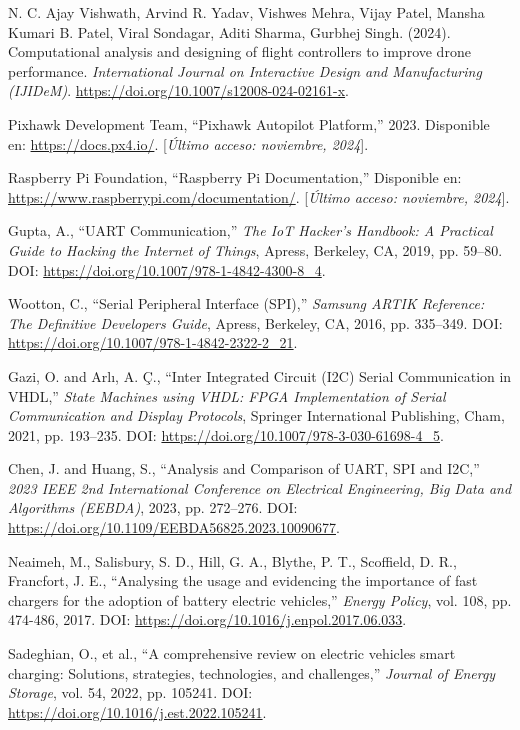 \begin{thebibliography}{30}
    N. C. Ajay Vishwath, Arvind R. Yadav, Vishwes Mehra, Vijay Patel, Mansha Kumari B. Patel, Viral Sondagar, Aditi Sharma, Gurbhej Singh. (2024). Computational analysis and designing of flight controllers to improve drone performance. \textit{International Journal on Interactive Design and Manufacturing (IJIDeM)}. \url{https://doi.org/10.1007/s12008-024-02161-x}.

    Pixhawk Development Team, ``Pixhawk Autopilot Platform,'' 2023. Disponible en: \url{https://docs.px4.io/}. [\textit{Último acceso: noviembre, 2024}].

    Raspberry Pi Foundation, ``Raspberry Pi Documentation,'' Disponible en: \url{https://www.raspberrypi.com/documentation/}. [\textit{Último acceso: noviembre, 2024}].

    Gupta, A., ``UART Communication,'' \textit{The IoT Hacker's Handbook: A Practical Guide to Hacking the Internet of Things}, Apress, Berkeley, CA, 2019, pp. 59--80. DOI: \url{https://doi.org/10.1007/978-1-4842-4300-8_4}.

    Wootton, C., ``Serial Peripheral Interface (SPI),'' \textit{Samsung ARTIK Reference: The Definitive Developers Guide}, Apress, Berkeley, CA, 2016, pp. 335--349. DOI: \url{https://doi.org/10.1007/978-1-4842-2322-2_21}.

    Gazi, O. and Arlı, A. Ç., ``Inter Integrated Circuit (I2C) Serial Communication in VHDL,'' \textit{State Machines using VHDL: FPGA Implementation of Serial Communication and Display Protocols}, Springer International Publishing, Cham, 2021, pp. 193--235. DOI: \url{https://doi.org/10.1007/978-3-030-61698-4_5}.

    Chen, J. and Huang, S., ``Analysis and Comparison of UART, SPI and I2C,'' \textit{2023 IEEE 2nd International Conference on Electrical Engineering, Big Data and Algorithms (EEBDA)}, 2023, pp. 272--276. DOI: \url{https://doi.org/10.1109/EEBDA56825.2023.10090677}.

    Neaimeh, M., Salisbury, S. D., Hill, G. A., Blythe, P. T., Scoffield, D. R., Francfort, J. E., ``Analysing the usage and evidencing the importance of fast chargers for the adoption of battery electric vehicles,'' \textit{Energy Policy}, vol. 108, pp. 474-486, 2017. DOI: \url{https://doi.org/10.1016/j.enpol.2017.06.033}.

    Sadeghian, O., et al., ``A comprehensive review on electric vehicles smart charging: Solutions, strategies, technologies, and challenges,'' \textit{Journal of Energy Storage}, vol. 54, 2022, pp. 105241. DOI: \url{https://doi.org/10.1016/j.est.2022.105241}.


\end{thebibliography}
